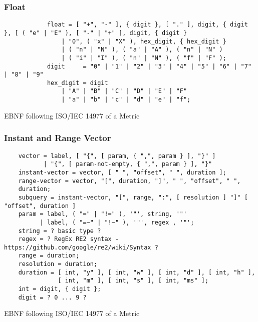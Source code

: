 \subsubsection{Float}
\begin{listing}[H]
	\begin{samepage}
		\begin{verbatim}
			float = [ "+", "-" ], { digit }, [ "." ], digit, { digit }, [ ( "e" | "E" ), [ "-" | "+" ], digit, { digit }
				| "0", ( "x" | "X" ), hex_digit, { hex_digit }
				| ( "n" | "N" ), ( "a" | "A" ), ( "n" | "N" )
				| ( "i" | "I" ), ( "n" | "N" ), ( "f" | "F" );
			digit     = "0" | "1" | "2" | "3" | "4" | "5" | "6" | "7" | "8" | "9"
			hex_digit = digit
				| "A" | "B" | "C" | "D" | "E" | "F"
				| "a" | "b" | "c" | "d" | "e" | "f";
		\end{verbatim}
		\caption{EBNF following ISO/IEC 14977 of a Metric}
	\end{samepage}
\end{listing}

\subsubsection{Instant and Range Vector}
\begin{listing}[H]
\begin{samepage}
\begin{verbatim}
	vector = label, [ "{", [ param, { ",", param } ], "}" ]
	       | "{", [ param-not-empty, { ",", param } ], "}"
	instant-vector = vector, [ " ", "offset", " ", duration ];
	range-vector = vector, "[", duration, "]", " ", "offset", " ",
	duration;
	subquery = instant-vector, "[", range, ":", [ resolution ] "]" [ "offset", duration ]
	param = label, ( "=" | "!=" ), '"', string, '"'
	      | label, ( "=~" | "!~" ), '"', regex , '"';
	string = ? basic type ?
	regex = ? RegEx RE2 syntax - https://github.com/google/re2/wiki/Syntax ?
	range = duration;
	resolution = duration;
	duration = [ int, "y" ], [ int, "w" ], [ int, "d" ], [ int, "h" ], 
		       [ int, "m" ], [ int, "s" ], [ int, "ms" ];
	int = digit, { digit };
	digit = ? 0 ... 9 ?
\end{verbatim}
\caption{EBNF following ISO/IEC 14977 of a Metric}
\end{samepage}
\end{listing}

